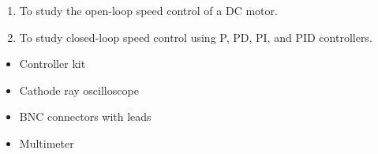 
\begin{objectives}
  \begin{enumerate}
    \item To study the open-loop speed control of a DC motor.
    \item To study closed-loop speed control using P, PD, PI, and PID controllers.
  \end{enumerate}
\end{objectives}

\begin{equipment}
  \begin{itemize}
    \item Controller kit
    \item Cathode ray oscilloscope
    \item BNC connectors with leads
    \item Multimeter
  \end{itemize}
\end{equipment}

